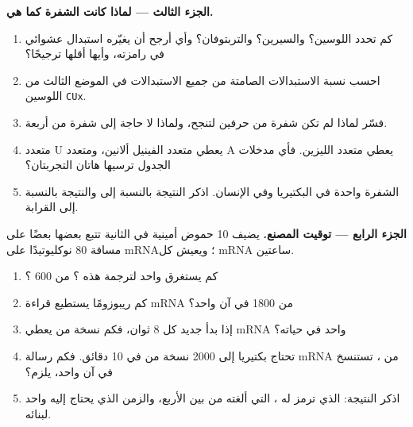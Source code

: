\begin{problem}
\medskip
\noindent\textbf{الجزء الثالث --- لماذا كانت الشفرة كما هي.}
\begin{enumerate}[resume]
  \item كم  تحدد اللوسين؟ والسيرين؟ والتربتوفان؟ وأي 
        أرجح أن يغيّره استبدال عشوائي في رامزته، وأيها أقلها ترجيحًا؟
  \item احسب نسبة الاستبدالات الصامتة من جميع الاستبدالات في الموضع
        الثالث من  اللوسين \texttt{CUx}.
  \item فسّر لماذا لم تكن شفرة من حرفين لتنجح، ولماذا لا حاجة إلى شفرة
        من أربعة.
  \item متعدد U يعطي متعدد الفينيل ألانين، ومتعدد A يعطي متعدد
        الليزين. فأي مدخلات الجدول ترسيها هاتان التجربتان؟
  \item الشفرة واحدة في البكتيريا وفي الإنسان. اذكر النتيجة بالنسبة
        إلى  والنتيجة بالنسبة إلى القرابة.
\end{enumerate}

\medskip
\noindent\textbf{الجزء الرابع --- توقيت المصنع.}
يضيف  10 حموض أمينية في الثانية  تتبع بعضها بعضًا
على مسافة 80 نوكليوتيدًا على mRNA؛ ويعيش كل mRNA ساعتين.
\begin{enumerate}[resume]
  \item كم يستغرق  واحد لترجمة  هذه ؟  من
        600 ؟
  \item كم ريبوزومًا يستطيع قراءة mRNA من 1800  في آن واحد؟
  \item إذا بدأ  جديد كل 8 ثوان، فكم نسخة من  يعطي mRNA
        واحد في حياته؟
  \item تحتاج بكتيريا إلى \num{2000} نسخة من  في 10 دقائق. فكم
        رسالة mRNA من ، تستنسخ في آن واحد، يلزم؟
  \item اذكر النتيجة:  الذي ترمز له ،  التي
        ألغته من بين الأربع، والزمن الذي يحتاج إليه  واحد
        لبنائه.
\end{enumerate}
\end{problem}

